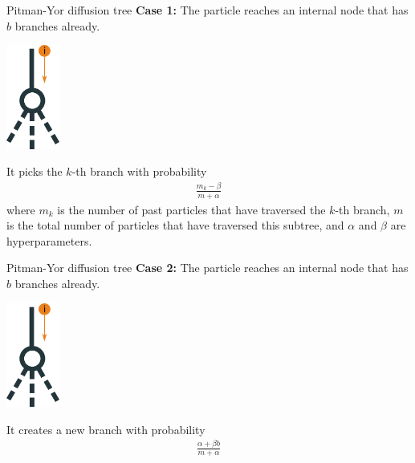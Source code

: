 \documentclass[10pt, compress]{beamer}
\begin{document}
\begin{frame}{Pitman-Yor diffusion tree}
  \textbf{Case 1:} 
  The particle reaches an internal node that has $b$ branches already.
  \begin{center}
      \includegraphics[width=0.13\textwidth]{img/pydt-1}
  \end{center}

  \pause

  It picks the $k$-th branch with probability
  \begin{align}
      \frac{m_k - \beta}{m + \alpha}
  \end{align}
  where $m_k$ is the number of past particles that have traversed the $k$-th branch,
  $m$ is the total number of particles that have traversed this subtree,
  and $\alpha$ and $\beta$ are hyperparameters.

\end{frame}

\begin{frame}{Pitman-Yor diffusion tree}
  \textbf{Case 2:} 
  The particle reaches an internal node that has $b$ branches already.
  \begin{center}
      \includegraphics[width=0.13\textwidth]{img/pydt-1}
  \end{center}

  \pause

  It creates a new branch with probability
  \begin{align}
      \frac{\alpha + \beta b}{m + \alpha}
  \end{align}

\end{frame}
\end{document}
